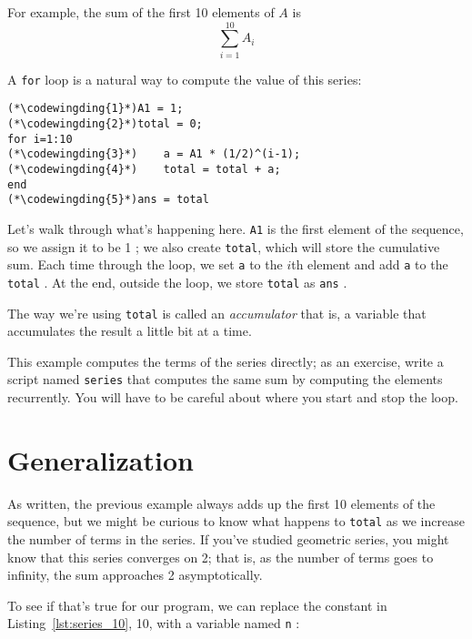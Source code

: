 
For example, the sum of the first 10 elements of $A$ is
\begin{equation}
\sum_{i=1}^{10} A_i
\end{equation}

A {\tt for} loop is a natural way to compute the value of this series:

\begin{lstlisting}[caption={A program that calculates a simple series}, label={lst:series_10}]
(*\codewingding{1}*)A1 = 1;
(*\codewingding{2}*)total = 0;
for i=1:10
(*\codewingding{3}*)    a = A1 * (1/2)^(i-1);
(*\codewingding{4}*)    total = total + a;
end
(*\codewingding{5}*)ans = total
\end{lstlisting}

Let's walk through what's happening here. {\tt A1} is the first element of the sequence, so we assign it to be 1 ; we also create {\tt total}, which will store the cumulative sum.
Each time through the loop, we set {\tt a} to the $i$th element  and add {\tt a} to the {\tt total} .
At the end, outside the loop, we store {\tt total} as {\tt ans} .

The way we're using {\tt total} is called an \emph{accumulator} that is, a variable that accumulates the result a little bit at a time.  



\begin{ex}
This example computes the terms of the series directly; as
an exercise, write a script named {\tt series} that computes
the same sum by computing the elements recurrently.  You will
have to be careful about where you start and stop the loop.
\end{ex}


\section{Generalization}


As written, the previous example always adds up the first 10
elements of the sequence, but we might be curious to know what
happens to {\tt total} as we increase the
number of terms in the series.  If you've studied geometric
series, you might know that this series converges on 2; that is,
as the number of terms goes to infinity, the sum approaches
2 asymptotically.

To see if that's true for our program, we can replace the
constant in Listing~\ref{lst:series_10}, 10, with a variable named {\tt n} :

